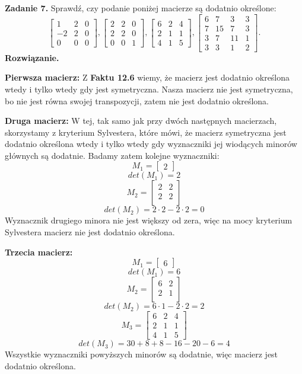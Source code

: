 \documentclass[12pt,a4paper]{article}
\begin{document}
\noindent
\textbf{Zadanie 7.}
Sprawdź, czy podanie poniżej macierze są dodatnio określone:
\[
\left[
\begin{array}{ccc}
1  & 2 & 0\\
-2 & 2 & 0\\
0  & 0 & 0
\end{array}\right]
,
\left[
\begin{array}{ccc}
2 & 2 & 0\\
2 & 2 & 0\\
0 & 0 & 1
\end{array}\right]
,
\left[
\begin{array}{ccc}
6 & 2 & 4\\
2 & 1 & 1\\
4 & 1 & 5
\end{array}\right]
,
\left[
\begin{array}{cccc}
6 & 7  & 3 & 3\\
7 & 15 & 7 & 3\\
3 & 7  & 11 & 1\\
3 & 3  & 1  & 2
\end{array}\right]
.
\]
\textbf{Rozwiązanie.}

\textbf{Pierwsza macierz:}
Z \textbf{Faktu 12.6} wiemy, że macierz jest dodatnio określona wtedy i tylko wtedy gdy jest symetryczna. Nasza macierz nie jest symetryczna, bo nie jest równa swojej transpozycji, zatem nie jest dodatnio określona.

\textbf{Druga macierz:} W tej, tak samo jak przy dwóch następnych macierzach, skorzystamy z kryterium Sylvestera, które mówi, że macierz symetryczna jest dodatnio określona wtedy i tylko wtedy gdy wyznaczniki jej wiodących minorów głównych są dodatnie.
Badamy zatem kolejne wyznaczniki:
\[
M_1=
\left[
\begin{array}{c}
2
\end{array}\right]
\]
\[
det(M_1)=2
\]
\[
M_2=
\left[
\begin{array}{cc}
2 & 2 \\
2 & 2 \\
\end{array}\right]
\]
\[
det(M_2) = 2 \cdot 2 - 2 \cdot 2 = 0 
\]
Wyznacznik drugiego minora nie jest większy od zera, więc na mocy kryterium Sylvestera macierz nie jest dodatnio określona.

\textbf{Trzecia macierz:}
\[
M_1=
\left[
\begin{array}{c}
6
\end{array}\right]
\]
\[
det(M_1)=6
\]
\[
M_2=
\left[
\begin{array}{cc}
6 & 2 \\
2 & 1 \\
\end{array}\right]
\]
\[
det(M_2) = 6 \cdot 1 - 2 \cdot 2 = 2 
\]
\[
M_3=
\left[
\begin{array}{ccc}
6 & 2 & 4\\
2 & 1 & 1\\
4 & 1 & 5
\end{array}\right]
\]
\[
det(M_3)= 30 + 8 + 8 - 16 - 20 - 6 = 4  
\]
Wszystkie wyznaczniki powyższych minorów są dodatnie, więc macierz jest dodatnio określona.
\end{document}
